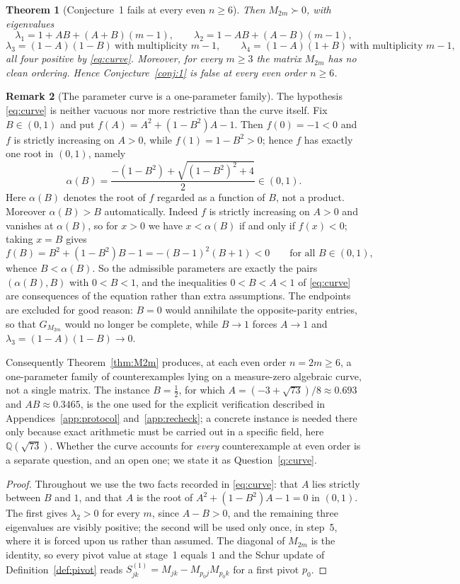 \documentclass[11pt]{article}
\theoremstyle{plain}
\newtheorem{theorem}{Theorem}[section]
\theoremstyle{definition}
\newtheorem{remark}[theorem]{Remark}
\begin{document}
\begin{aiblock}
\begin{theorem}[Conjecture~1 fails at every even $n\ge6$]
Then $M_{2m}\succ0$, with eigenvalues
\[
\lambda_1=1+AB+(A+B)(m-1),\qquad
\lambda_2=1-AB+(A-B)(m-1),
\]
\[
\lambda_3=(1-A)(1-B)\ \text{with multiplicity } m-1,\qquad
\lambda_4=(1-A)(1+B)\ \text{with multiplicity } m-1,
\]
all four positive by \eqref{eq:curve}. Moreover, for every $m\ge3$ the matrix $M_{2m}$ has no clean
ordering. Hence Conjecture~\ref{conj:1} is false at every even order $n\ge6$.
\end{theorem}
\begin{remark}[The parameter curve is a one-parameter family]\label{rem:curve-family}
The hypothesis \eqref{eq:curve} is neither vacuous nor more restrictive than the curve itself. Fix
$B\in(0,1)$ and put $f(A)=A^2+(1-B^2)A-1$. Then $f(0)=-1<0$ and $f$ is strictly increasing on
$A>0$, while $f(1)=1-B^2>0$; hence $f$ has exactly one root in $(0,1)$, namely
\[
  \alpha(B)=\frac{-(1-B^2)+\sqrt{(1-B^2)^2+4}}{2}\in(0,1).
\]
Here $\alpha(B)$ denotes the root of $f$ regarded as a function of $B$, not a product.
Moreover $\alpha(B)>B$ automatically. Indeed $f$ is strictly increasing on $A>0$ and vanishes at
$\alpha(B)$, so for $x>0$ we have $x<\alpha(B)$ if and only if $f(x)<0$; taking $x=B$ gives
\[
  f(B)=B^2+(1-B^2)B-1=-(B-1)^2(B+1)<0\qquad\text{for all }B\in(0,1),
\]
whence $B<\alpha(B)$. So the admissible parameters are exactly the pairs $(\alpha(B),B)$ with
$0<B<1$, and the inequalities $0<B<A<1$ of \eqref{eq:curve} are
consequences of the equation rather than extra assumptions. The endpoints are excluded for good
reason: $B=0$ would annihilate the opposite-parity entries, so that $G_{M_{2m}}$ would no longer be
complete, while $B\to1$ forces $A\to1$ and $\lambda_3=(1-A)(1-B)\to0$.

Consequently Theorem~\ref{thm:M2m} produces, at each even order $n=2m\ge6$, a one-parameter family of
counterexamples lying on a measure-zero algebraic curve, not a single matrix. The instance $B=\tfrac12$,
for which $A=(-3+\sqrt{73})/8\approx0.693$ and $AB\approx0.3465$, is the one used for the explicit
verification described in Appendices~\ref{app:protocol} and~\ref{app:recheck}; a concrete instance is
needed there only because exact arithmetic must be carried out in a specific field, here
$\mathbb{Q}(\sqrt{73})$.
Whether the curve accounts for \emph{every} counterexample at even order is a separate
question, and an open one; we state it as Question~\ref{q:curve}.
\end{remark}
\begin{proof}
Throughout we use the two facts recorded in \eqref{eq:curve}: that $A$ lies strictly between $B$ and
$1$, and that $A$ is the root of $A^2+(1-B^2)A-1=0$ in $(0,1)$. The first gives $\lambda_2>0$ for
every $m$, since $A-B>0$, and the remaining three eigenvalues are visibly positive; the second will be
used only once, in step~5, where it is forced upon us rather than assumed. The diagonal of $M_{2m}$ is
the identity, so every pivot value at stage~1 equals $1$ and the Schur update of
Definition~\ref{def:pivot} reads $S^{(1)}_{jk}=M_{jk}-M_{p_0j}M_{p_0k}$ for a first pivot $p_0$.


\end{proof}
\end{aiblock}
\end{document}
